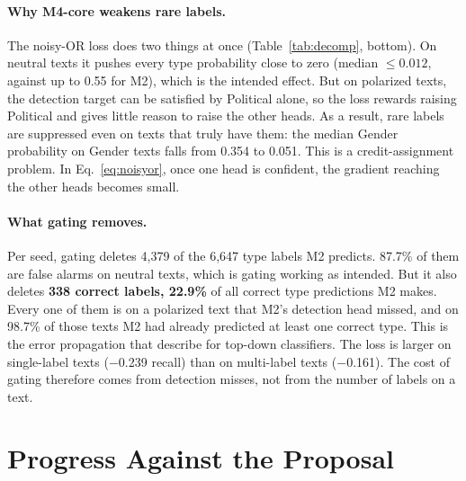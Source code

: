 \documentclass[11pt]{article}
\begin{document}
\paragraph{Why M4-core weakens rare labels.}
The noisy-OR loss does two things at once (Table~\ref{tab:decomp}, bottom).
On neutral texts it pushes every type probability close to zero (median
$\le 0.012$, against up to 0.55 for M2), which is the intended effect. But
on polarized texts, the detection target can be satisfied by Political
alone, so the loss rewards raising Political and gives little reason to
raise the other heads. As a result, rare labels are suppressed even on texts
that truly have them: the median Gender probability on Gender texts falls
from 0.354 to 0.051. This is a credit-assignment problem. In
Eq.~\ref{eq:noisyor}, once one head is confident, the gradient reaching the
other heads becomes small.

\paragraph{What gating removes.}
Per seed, gating deletes 4{,}379 of the 6{,}647 type labels M2 predicts.
87.7\% of them are false alarms on neutral texts, which is gating working as
intended. But it also deletes \textbf{338 correct labels, 22.9\%} of all
correct type predictions M2 makes. Every one of them is on a polarized text
that M2's detection head missed, and on 98.7\% of those texts M2 had already
predicted at least one correct type. This is the error propagation that
\citet{silla2011survey} describe for top-down classifiers. The loss is
larger on single-label texts ($-$0.239 recall) than on multi-label texts
($-$0.161). The cost of gating therefore comes from detection misses, not
from the number of labels on a text.

\section{Progress Against the Proposal}
\label{sec:progress}
\end{document}
